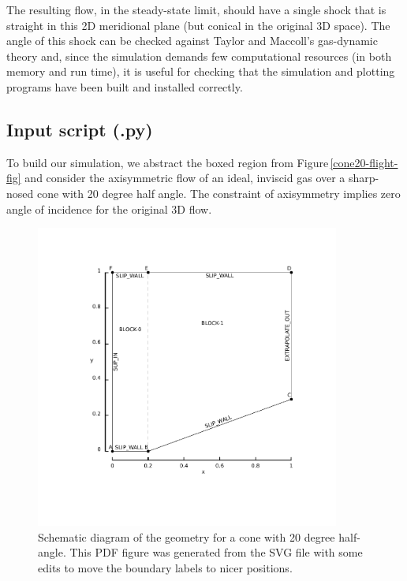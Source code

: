 \medskip
The resulting flow, in the steady-state limit, should have a single shock that is 
straight in this 2D meridional plane (but conical in the original 3D space).
The angle of this shock can be checked against Taylor and Maccoll's gas-dynamic theory and,
since the simulation demands few computational resources (in both memory and run time), 
it is useful for checking that the simulation and
plotting programs have been built and installed correctly.


\subsection{Input script (.py)}
%
To build our simulation, we abstract the boxed region from Figure\,\ref{cone20-flight-fig}
and consider the axisymmetric flow of an ideal, inviscid gas over a sharp-nosed cone 
with 20 degree half angle.
The constraint of axisymmetry implies zero angle of incidence for the original 3D flow.

\begin{figure}[htbp]
\begin{center}
\includegraphics[width=10cm, viewport=76 78 389 398]{../2D/cone20-simple/cone20_svg.pdf}
\end{center}
\caption{Schematic diagram of the geometry for a cone 
         with 20 degree half-angle.
	 This PDF figure was generated from the SVG file with some edits 
	 to move the boundary labels to nicer positions.}
\label{cone20-geometry-fig}
\end{figure}

\noindent\topbar

\bottombar

